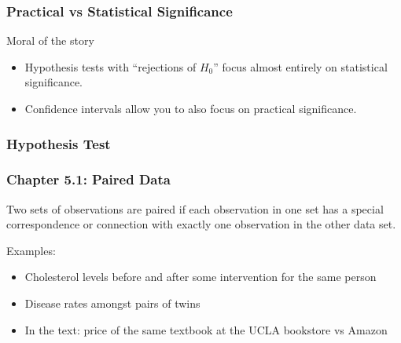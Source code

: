 \documentclass[handout]{beamer}
\newcommand{\blue}[1]{\textcolor{blue2}{#1}}
\begin{document}
\begin{frame}
\frametitle{Practical vs Statistical Significance}

Moral of the story

\begin{itemize}
\pause\item Hypothesis tests with ``rejections of $H_0$'' focus almost entirely on \blue{statistical significance}.
\pause\item Confidence intervals allow you to also focus on \blue{practical significance}.  
\end{itemize}

\end{frame}


\begin{frame}[fragile]
\frametitle{Hypothesis Test}



\end{frame}


\begin{frame}[fragile]
\frametitle{Chapter 5.1: Paired Data}
Two sets of observations are \blue{paired} if each observation in one set has a special correspondence or connection with exactly one observation in the other data set.

\vspace{0.25cm} 

\pause Examples:

\begin{itemize}
\item Cholesterol levels before and after some intervention for the same person
\pause \item Disease rates amongst pairs of twins
\pause \item In the text:  price of the same textbook at the UCLA bookstore vs Amazon
\end{itemize}

\end{frame}
\end{document}
